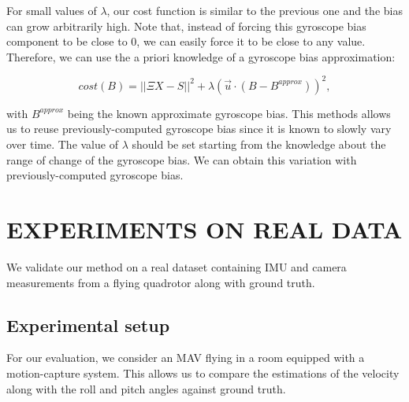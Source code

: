 \documentclass[letterpaper, 10pt, conference, final]{ieeeconf}  %
\begin{document}

For small values of $\lambda$, our cost function is similar to the previous one and the bias can grow arbitrarily high.
Note that, instead of forcing this gyroscope bias component to be close to $0$, we can easily force it to be close to any value.
Therefore, we can use the a priori knowledge of a gyroscope bias approximation:

\[
cost(B) = ||\Xi X - S||^2 +  \lambda (\vec{u} \cdot (B - B^{approx} ))^2,
\]

\noindent with $B^{approx}$ being the known approximate gyroscope bias.
This methods allows us to reuse previously-computed gyroscope bias since it is known to slowly vary over time.
The value of $\lambda$ should be set starting from the knowledge about the range of change of the gyroscope bias.
We can obtain this variation with previously-computed gyroscope bias.

\section{EXPERIMENTS ON REAL DATA}\label{SectionPerformance}

We validate our method on a real dataset containing IMU and camera measurements from a flying quadrotor along with ground truth.

\subsection{Experimental setup}\label{SubsectionSetup}

For our evaluation, we consider an MAV flying in a room equipped with a motion-capture system.
This allows us to compare the estimations of the velocity along with the roll and pitch angles against ground truth.
\end{document}
